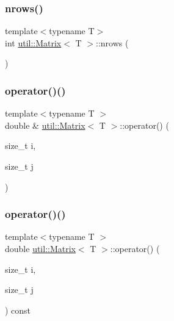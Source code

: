 \mbox{\label{classutil_1_1Matrix_a58f84228a561ec5152e8fd9d3800e7bc}} 
\subsubsection{\texorpdfstring{nrows()}{nrows()}}
{\footnotesize\ttfamily template$<$typename T$>$ \\
int \hyperlink{classutil_1_1Matrix}{util\+::\+Matrix}$<$ T $>$\+::nrows (\begin{DoxyParamCaption}{ }\end{DoxyParamCaption})}

\mbox{\label{classutil_1_1Matrix_a7c2d260e685310c403600ed18f02f967}} 
\subsubsection{\texorpdfstring{operator()()}{operator()()}\hspace{0.1cm}{\footnotesize\ttfamily [1/2]}}
{\footnotesize\ttfamily template$<$typename T $>$ \\
double \& \hyperlink{classutil_1_1Matrix}{util\+::\+Matrix}$<$ T $>$\+::operator() (\begin{DoxyParamCaption}\item[{size\+\_\+t}]{i,  }\item[{size\+\_\+t}]{j }\end{DoxyParamCaption})}

\mbox{\label{classutil_1_1Matrix_a1cdfea411728de3e4028d44cfbb4b54a}} 
\subsubsection{\texorpdfstring{operator()()}{operator()()}\hspace{0.1cm}{\footnotesize\ttfamily [2/2]}}
{\footnotesize\ttfamily template$<$typename T $>$ \\
double \hyperlink{classutil_1_1Matrix}{util\+::\+Matrix}$<$ T $>$\+::operator() (\begin{DoxyParamCaption}\item[{size\+\_\+t}]{i,  }\item[{size\+\_\+t}]{j }\end{DoxyParamCaption}) const}



